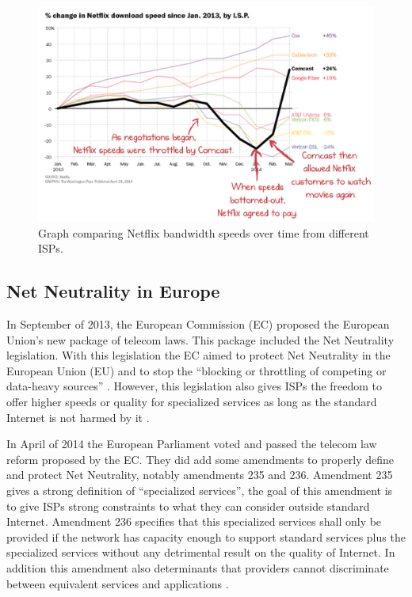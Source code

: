 \documentclass{sigcomm-alternate}
\begin{document}
\begin{figure}
	\label{fig:netflix}
	\includegraphics[scale=.20]{NetflixGraph.png}
	\caption{Graph comparing Netflix bandwidth speeds over time from different ISPs.}
\end{figure}


\subsection{Net Neutrality in Europe}

In September of 2013, the European Commission (EC) proposed the European Union’s new package of telecom laws. This package included the Net Neutrality legislation. With this legislation the EC aimed to protect Net Neutrality in the European Union (EU) and to stop the “blocking or throttling of competing or data-heavy sources” \cite{economics}. However, this legislation also gives ISPs the freedom to offer higher speeds or quality for specialized services as long as the standard Internet is not harmed by it \cite{economics}.

In April of 2014 the European Parliament voted and passed the telecom law reform proposed by the EC. They did add some amendments to properly define and protect Net Neutrality, notably amendments 235 and 236. Amendment 235 gives a strong definition of “specialized services”, the goal of this amendment is to give ISPs strong constraints to what they can consider outside standard Internet. Amendment 236 specifies that this specialized services shall only be provided if the network has capacity enough to support standard services plus the specialized services without any detrimental result on the quality of Internet. In addition this amendment also determinants that providers cannot discriminate between equivalent services and applications \cite{gigaom}.
\end{document}

